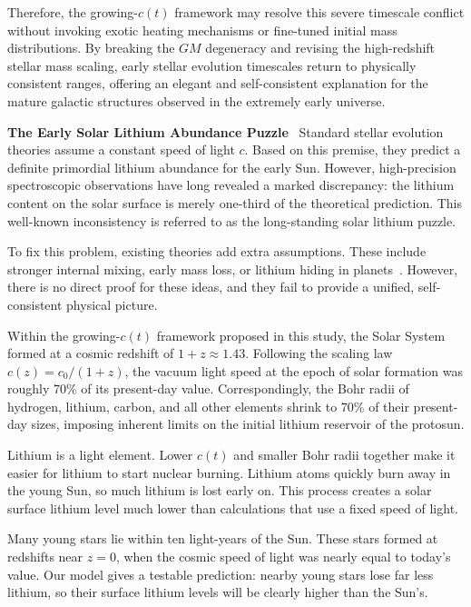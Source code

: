 \documentclass[12pt,leqno]{article}
\begin{document}
{	\medskip
	Therefore, the growing-$c(t)$ framework may resolve this severe timescale conflict without invoking exotic heating mechanisms or fine-tuned initial mass distributions. By breaking the $GM$ degeneracy and revising the high-redshift stellar mass scaling, early stellar evolution timescales return to physically consistent ranges, offering an elegant and self-consistent explanation for the mature galactic structures observed in the extremely early universe.
	
	
	

	\medskip
	\bigskip
	\textbf{The Early Solar Lithium Abundance Puzzle}\,\,\,
	Standard stellar evolution theories assume a constant speed of light $c$. Based on this premise, they predict a definite primordial lithium abundance for the early Sun. However, high-precision spectroscopic observations have long revealed a marked discrepancy: the lithium content on the solar surface is merely one-third of the theoretical prediction. This well-known inconsistency is referred to as the long-standing solar lithium puzzle.
	
	\medskip
	To fix this problem, existing theories add extra assumptions. These include stronger internal mixing, early mass loss, or lithium hiding in planets~\cite{Korn:2019}. However, there is no direct proof for these ideas, and they fail to provide a unified, self-consistent physical picture.
	
	\medskip
	Within the growing-$c(t)$ framework proposed in this study, the Solar System formed at a cosmic redshift of $1+z\approx1.43$. Following the scaling law $c(z)=c_0/(1+z)$, the vacuum light speed at the epoch of solar formation was roughly 70\% of its present-day value. Correspondingly, the Bohr radii of hydrogen, lithium, carbon, and all other elements shrink to 70\% of their present-day sizes, imposing inherent limits on the initial lithium reservoir of the protosun.
	
	\medskip
	Lithium is a light element. Lower $c(t)$ and smaller Bohr radii together make it easier for lithium to start nuclear burning. Lithium atoms quickly burn away in the young Sun, so much lithium is lost early on. This process creates a solar surface lithium level much lower than calculations that use a fixed speed of light.
	
	\medskip
	Many young stars lie within ten light-years of the Sun. These stars formed at redshifts near $z=0$, when the cosmic speed of light was nearly equal to today’s value. Our model gives a testable prediction: nearby young stars lose far less lithium, so their surface lithium levels will be clearly higher than the Sun’s.
	
}
\end{document}
